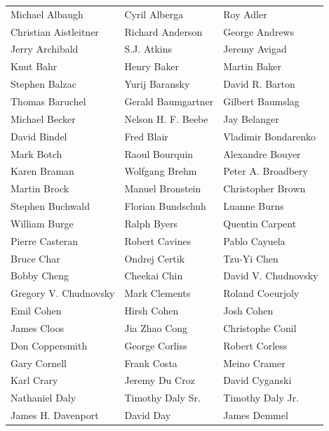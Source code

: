 \begin{tabular}{lll}
Michael Albaugh        & Cyril Alberga          & Roy Adler\\
Christian Aistleitner  & Richard Anderson       & George Andrews\\
Jerry Archibald        & S.J. Atkins            & Jeremy Avigad\\
Knut Bahr              & Henry Baker            & Martin Baker\\
Stephen Balzac         & Yurij Baransky         & David R. Barton\\
Thomas Baruchel        & Gerald Baumgartner     & Gilbert Baumslag\\
Michael Becker         & Nelson H. F. Beebe     & Jay Belanger\\
David Bindel           & Fred Blair             & Vladimir Bondarenko\\
Mark Botch             & Raoul Bourquin         & Alexandre Bouyer\\
Karen Braman           & Wolfgang Brehm         & Peter A. Broadbery\\
Martin Brock           & Manuel Bronstein       & Christopher Brown\\
Stephen Buchwald       & Florian Bundschuh      & Luanne Burns\\
William Burge          & Ralph Byers            & Quentin Carpent\\
Pierre Casteran        & Robert Cavines         & Pablo Cayuela\\
Bruce Char             & Ondrej Certik          & Tzu-Yi Chen\\
Bobby Cheng            & Cheekai Chin           & David V. Chudnovsky\\
Gregory V. Chudnovsky  & Mark Clements          & Roland Coeurjoly\\
Emil Cohen             & Hirsh Cohen            & Josh Cohen\\
James Cloos            & Jia Zhao Cong          & Christophe Conil\\
Don Coppersmith        & George Corliss         & Robert Corless\\
Gary Cornell           & Frank Costa            & Meino Cramer\\
Karl Crary             & Jeremy Du Croz         & David Cyganski\\
Nathaniel Daly         & Timothy Daly Sr.       & Timothy Daly Jr.\\
James H. Davenport     & David Day              & James Demmel\\

\end{tabular}
